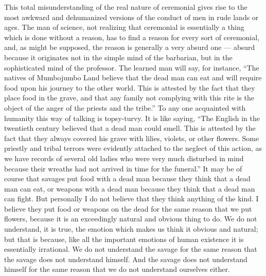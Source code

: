 This total misunderstanding of the real nature of ceremonial gives rise to the most awkward and dehumanized versions of the conduct of men in rude lands or ages. The man of science, not realizing that ceremonial is essentially a thing which is done without a reason, has to find a reason for every sort of ceremonial, and, as might be supposed, the reason is generally a very absurd one — absurd because it originates not in the simple mind of the barbarian, but in the sophisticated mind of the professor. The learned man will say, for instance, “The natives of Mumbojumbo Land believe that the dead man can eat and will require food upon his journey to the other world. This is attested by the fact that they place food in the grave, and that any family not complying with this rite is the object of the anger of the priests and the tribe.” To any one acquainted with humanity this way of talking is topsy-turvy. It is like saying, “The English in the twentieth century believed that a dead man could smell. This is attested by the fact that they always covered his grave with lilies, violets, or other flowers. Some priestly and tribal terrors were evidently attached to the neglect of this action, as we have records of several old ladies who were very much disturbed in mind because their wreaths had not arrived in time for the funeral.” It may be of course that savages put food with a dead man because they think that a dead man can eat, or weapons with a dead man because they think that a dead man can fight. But personally I do not believe that they think anything of the kind. I believe they put food or weapons on the dead for the same reason that we put flowers, because it is an exceedingly natural and obvious thing to do. We do not understand, it is true, the emotion which makes us think it obvious and natural; but that is because, like all the important emotions of human existence it is essentially irrational. We do not understand the savage for the same reason that the savage does not understand himself. And the savage does not understand himself for the same reason that we do not understand ourselves either.

